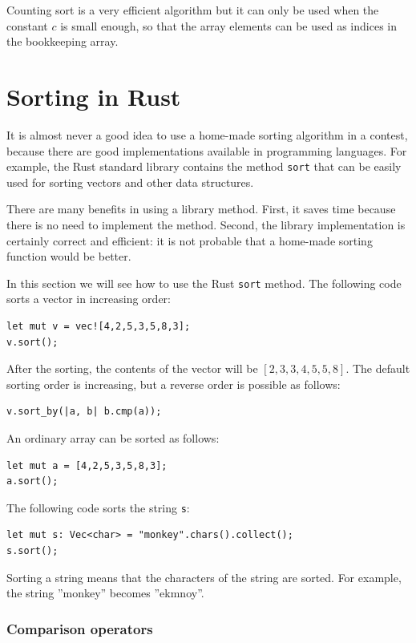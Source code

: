 Counting sort is a very efficient algorithm
but it can only be used when the constant $c$
is small enough, so that the array elements can
be used as indices in the bookkeeping array.

\section{Sorting in Rust}


It is almost never a good idea to use
a home-made sorting algorithm
in a contest, because there are good
implementations available in programming languages.
For example, the Rust standard library contains
the method \texttt{sort} that can be easily used for
sorting vectors and other data structures.

There are many benefits in using a library method.
First, it saves time because there is no need to
implement the method.
Second, the library implementation is
certainly correct and efficient: it is not probable
that a home-made sorting function would be better.

In this section we will see how to use the
Rust \texttt{sort} method.
The following code sorts
a vector in increasing order:
\begin{lstlisting}
let mut v = vec![4,2,5,3,5,8,3];
v.sort();
\end{lstlisting}
After the sorting, the contents of the
vector will be
$[2,3,3,4,5,5,8]$.
The default sorting order is increasing,
but a reverse order is possible as follows:
\begin{lstlisting}
v.sort_by(|a, b| b.cmp(a));
\end{lstlisting}
An ordinary array can be sorted as follows:
\begin{lstlisting}
let mut a = [4,2,5,3,5,8,3];
a.sort();
\end{lstlisting}
\newpage
The following code sorts the string \texttt{s}:
\begin{lstlisting}
let mut s: Vec<char> = "monkey".chars().collect();
s.sort();
\end{lstlisting}
Sorting a string means that the characters
of the string are sorted.
For example, the string ''monkey'' becomes ''ekmnoy''.

\subsubsection{Comparison operators}


